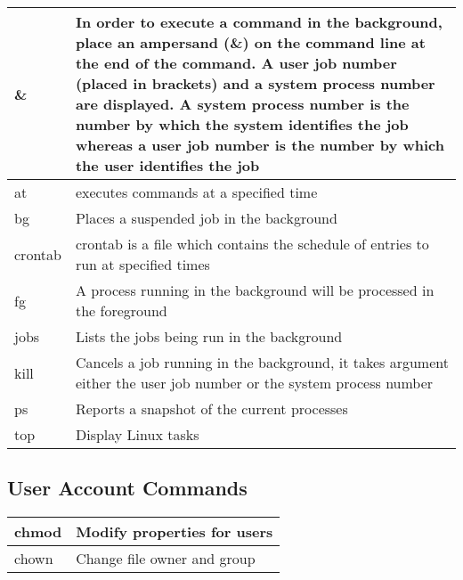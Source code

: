 \begin{tabular}{|p{}|p{}|} \hline
\&      & In order to execute a command in the background, place an ampersand (\&) on the command line at the end of the command. A user job number (placed in brackets) and a system process number are displayed. A system process number is the number by which the system identifies the job whereas a user job number is the number by which the user identifies the job \\ \hline
at      & executes commands at a specified time \\ \hline
bg      & Places a suspended job in the background \\ \hline
crontab & crontab is a file which contains the schedule of entries to run at specified times \\ \hline
fg      & A process running in the background will be processed in the foreground \\ \hline
jobs    & Lists the jobs being run in the background \\ \hline
kill    & Cancels a job running in the background, it takes argument either the user job number or the system process number \\ \hline
ps      & Reports a snapshot of the current processes \\ \hline
top     & Display Linux tasks \\ \hline
\end{tabular}


\subsection{User Account Commands}

\begin{tabular}{|p{}|p{}|} \hline
chmod    & Modify properties for users \\ \hline
chown    & Change file owner and group \\ \hline
\end{tabular}

